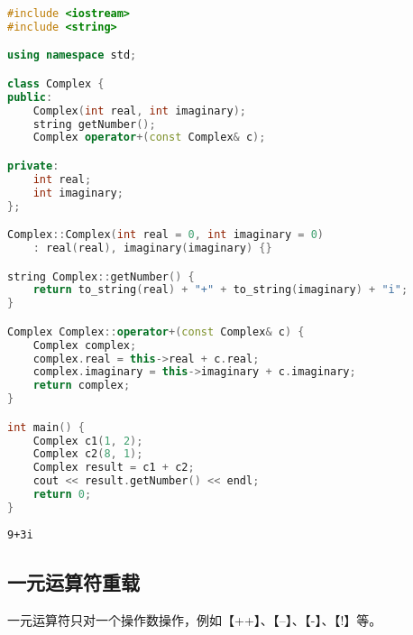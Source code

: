\begin{lstlisting}[language=C++]
#include <iostream>
#include <string>

using namespace std;

class Complex {
public:
    Complex(int real, int imaginary);
    string getNumber();
    Complex operator+(const Complex& c);

private:
    int real;
    int imaginary;
};

Complex::Complex(int real = 0, int imaginary = 0)
    : real(real), imaginary(imaginary) {}

string Complex::getNumber() {
    return to_string(real) + "+" + to_string(imaginary) + "i";
}

Complex Complex::operator+(const Complex& c) {
    Complex complex;
    complex.real = this->real + c.real;
    complex.imaginary = this->imaginary + c.imaginary;
    return complex;
}

int main() {
    Complex c1(1, 2);
    Complex c2(8, 1);
    Complex result = c1 + c2;
    cout << result.getNumber() << endl;
    return 0;
}
\end{lstlisting}

\begin{tcolorbox}
	\begin{verbatim}
9+3i
	\end{verbatim}
\end{tcolorbox}

\vspace{0.5cm}

\subsection{一元运算符重载}

一元运算符只对一个操作数操作，例如【++】、【--】、【-】、【!】等。\\


